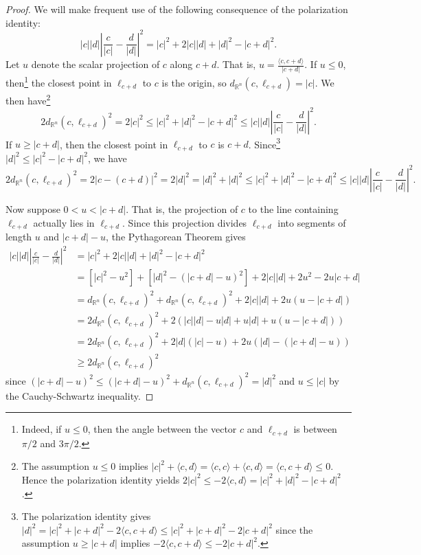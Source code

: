 \documentclass[11pt]{amsart}
\theoremstyle{definition}
\numberwithin{theorem}{section} \numberwithin{equation}{section}
\begin{document}
\begin{proof}
We will make frequent use of the following consequence of the polarization identity:
\begin{equation}
\label{polar}
|c||d| \left| \frac{c}{|c|} - \frac{d}{|d|} \right|^2 = |c|^2+2|c||d| + |d|^2 - |c+d|^2.
\end{equation}
Let $u$ denote the scalar projection of $c$ along $c+d$.
That is, $u = \frac{\langle c,c+d \rangle}{|c+d|}$.
If $u \leq 0$, then\footnote{Indeed, if $u \leq 0$, then the angle between the vector $c$ and $\ell_{c+d}$ is between $\pi / 2$ and $3 \pi / 2$.} 
the closest point in $\ell_{c+d}$ to $c$ is the origin, so $d_{\mathbb{R}^n}(c,\ell_{c+d}) = |c|$.
We then have\footnote{The assumption $u \leq 0$
implies $|c|^2 + \langle c,d \rangle
= \langle c,c \rangle + \langle c,d \rangle
= \langle c,c+d \rangle
\leq 0$.
Hence the polarization identity yields 
$2|c|^2 \leq - 2 \langle c,d \rangle = |c|^2  + |d|^2 - |c+d|^2$.}
$$
2d_{\mathbb{R}^n}(c,\ell_{c+d})^2 
= 2|c|^2
\leq |c|^2  + |d|^2 - |c+d|^2
\leq |c||d| \left| \frac{c}{|c|} - \frac{d}{|d|} \right|^2.
$$
If $u \geq |c+d|$, then the closest point in $\ell_{c+d}$ to $c$ is $c+d$.
Since\footnote{The polarization identity gives 
$|d|^2 = |c|^2 + |c+d|^2  - 2 \langle c,c+d \rangle
\leq |c|^2 + |c+d|^2 - 2|c+d|^2$ since the assumption $u \geq |c+d|$
implies $- 2 \langle c,c+d \rangle \leq -2|c+d|^2$.}
$|d|^2 \leq |c|^2 - |c+d|^2$, we have 
$$
2d_{\mathbb{R}^n}(c,\ell_{c+d})^2 
= 2|c - (c+d)|^2
=2|d|^2
=|d|^2 + |d|^2
\leq |c|^2 + |d|^2 - |c+d|^2
\leq |c||d| \left| \frac{c}{|c|} - \frac{d}{|d|} \right|^2.
$$


Now suppose $0 < u < |c+d|$.
That is, the projection of $c$ to the line containing $\ell_{c+d}$
actually lies in $\ell_{c+d}$.
Since this projection divides $\ell_{c+d}$ into segments of length $u$ and $|c+d|-u$,
the Pythagorean Theorem gives
\begin{align*}
|c||d| \left| \frac{c}{|c|} - \frac{d}{|d|} \right|^2 &= |c|^2+2|c||d| + |d|^2 - |c+d|^2 \\
& = \left[|c|^2 - u^2 \right] + \left[|d|^2 - (|c+d| - u)^2 \right] +2|c||d| +2u^2 - 2u|c+d| \\
& = d_{\mathbb{R}^n}(c,\ell_{c+d})^2 + d_{\mathbb{R}^n}(c,\ell_{c+d})^2 + 2|c||d| + 2u(u-|c+d|) \\
& = 2d_{\mathbb{R}^n}(c,\ell_{c+d})^2 + 2(|c||d| - u|d| + u|d| + u(u-|c+d|)) \\
& = 2d_{\mathbb{R}^n}(c,\ell_{c+d})^2 + 2|d|(|c| - u) + 2u(|d|- (|c+d|-u)) \\
& \geq 2d_{\mathbb{R}^n}(c,\ell_{c+d})^2
\end{align*}
since $(|c+d|-u)^2 \leq (|c+d|-u)^2 + d_{\mathbb{R}^n}(c,\ell_{c+d})^2 = |d|^2$
and $u \leq |c|$ by the Cauchy-Schwartz inequality.
\end{proof}
\end{document}
